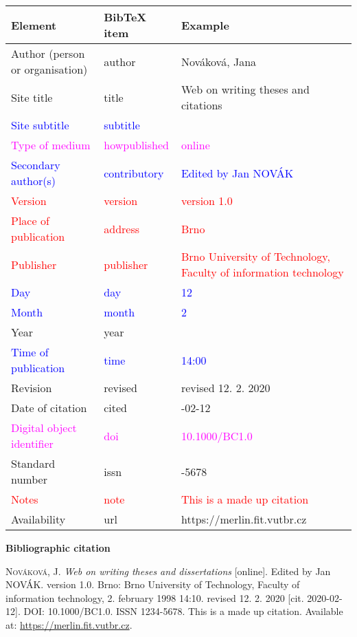 \begin{tabularx}{0.95\linewidth}{X X >{\raggedright\arraybackslash}X}
    Element & BibTeX item & Example\\\hline
    Author (person or organisation) & author & Nováková, Jana\\
    Site title & title & Web on writing theses and citations\\
    \textcolor{blue}{Site subtitle} &  \textcolor{blue}{subtitle} & \\
    \textcolor{magenta}{Type of medium} & \textcolor{magenta}{howpublished} & \textcolor{magenta}{online}\\
    \textcolor{blue}{Secondary author(s)} & \textcolor{blue}{contributory} & \textcolor{blue}{Edited by Jan NOVÁK}\\
    \textcolor{red}{Version} & \textcolor{red}{version} & \textcolor{red}{version 1.0}\\
    \textcolor{red}{Place of publication} & \textcolor{red}{address} & \textcolor{red}{Brno}\\
    \textcolor{red}{Publisher} & \textcolor{red}{publisher} & \textcolor{red}{Brno University of Technology, Faculty of information technology}\\
    \textcolor{blue}{Day} & \textcolor{blue}{day} & \textcolor{blue}{12}\\
    \textcolor{blue}{Month} & \textcolor{blue}{month} & \textcolor{blue}{2}\\
    Year & year & 2020\\
    \textcolor{blue}{Time of publication} & \textcolor{blue}{time} & \textcolor{blue}{14:00}\\
    Revision & revised & revised 12. 2. 2020\\
    Date of citation & cited & 2020-02-12\\
    \textcolor{magenta}{Digital object identifier} & \textcolor{magenta}{doi} & \textcolor{magenta}{10.1000/BC1.0}\\
    Standard number & issn & 1234-5678\\
    \textcolor{red}{Notes} & \textcolor{red}{note} & \textcolor{red}{This is a made up citation}\\
    Availability & url & https://merlin.fit.vutbr.cz
\end{tabularx}

\bigskip

\noindent \textbf{Bibliographic citation}

\medskip

\noindent \textsc{Nováková}, J. \textit{Web on writing theses and dissertations} [online]. Edited by Jan NOVÁK. version 1.0. Brno: Brno University of Technology, Faculty of information technology, 2. february 1998 14:10. revised 12. 2. 2020 [cit. 2020-02-12]. DOI: 10.1000/BC1.0. ISSN 1234-5678. This is a made up citation. Available at: \url{https://merlin.fit.vutbr.cz}.

%

